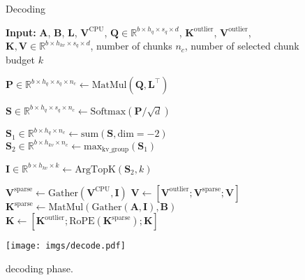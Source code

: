 \begin{figure}[t]
\begin{minipage}{0.57\linewidth}
\begin{algorithm}[H]
\caption{\Sys Decoding}
\label{alg:dec}
\begin{algorithmic}
\State \textbf{Input:} $\boldsymbol{A}$, $\boldsymbol{B}$, $\boldsymbol{L}$, $\boldsymbol{V}^{\text{CPU}}$, $\boldsymbol{Q} \in \mathbb{R}^{b\times h_{q} \times s_q \times d}$, $\boldsymbol{K}^{\text{outlier}}$, $ \boldsymbol{V}^{\text{outlier}}$, $\boldsymbol{K}, \boldsymbol{V} \in \mathbb{R}^{b\times h_{kv} \times s_q \times d}$, number of chunks $n_c$, number of selected chunk budget $k$

\State $\boldsymbol{P} \in \mathbb{R}^{b\times h_{q} \times s_q \times n_c}  \leftarrow \text{MatMul}(\boldsymbol{Q}, \boldsymbol{L^\top})$

\State $\boldsymbol{S} \in \mathbb{R}^{b\times h_{q} \times s_q \times n_c}  \leftarrow \text{Softmax}(\boldsymbol{P} / \sqrt{d})$

\State $\boldsymbol{S}_{1} \in \mathbb{R}^{b\times h_{q} \times n_c}  \leftarrow \text{sum}(\boldsymbol{S}, \text{dim}=-2) $
\State $\boldsymbol{S}_{2} \in \mathbb{R}^{b\times h_{kv} \times n_c}  \leftarrow \text{max}_{\text{kv\_group}}(\boldsymbol{S}_{1}) $

\State $\boldsymbol{I}\in \mathbb{R}^{b\times h_{kv} \times k} \leftarrow \text{ArgTopK}(\boldsymbol{S}_{2}, k)$

\State $\boldsymbol{V}^{\text{sparse}} \leftarrow \text{Gather}(\boldsymbol{V}^{\text{CPU}}, \boldsymbol{I})$
\State $\boldsymbol{V} \leftarrow [\boldsymbol{V}^{\text{outlier}}; \boldsymbol{V}^{\text{sparse}} ;\boldsymbol{V}]$
\State $\boldsymbol{K}^{\text{sparse}} \leftarrow \text{MatMul}(\text{Gather}(\boldsymbol{A}, \boldsymbol{I}),\boldsymbol{B})$
\State $\boldsymbol{K} \leftarrow [\boldsymbol{K}^{\text{outlier}} ;\text{RoPE}(\boldsymbol{K}^{\text{sparse}}); \boldsymbol{K}]$
\end{algorithmic}
\end{algorithm}
\end{minipage}
\hfill
\begin{minipage}{0.4\linewidth}
\centering
\texttt{[image: imgs/decode.pdf]}
\caption{\Sys decoding phase.}
\label{fig:decoding}
\end{minipage}
\end{figure}

